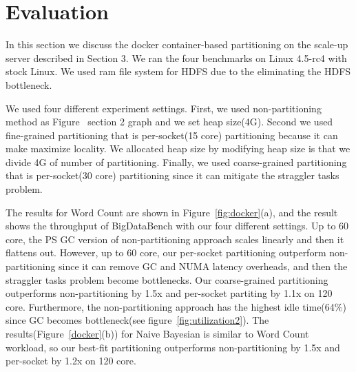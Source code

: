 \section{Evaluation}

In this section we discuss the docker container-based partitioning on the
scale-up server described in Section 3.
We ran the four benchmarks on Linux 4.5-rc4 with stock Linux. 
We used ram file system for HDFS due to the eliminating the HDFS bottleneck.

We used four different experiment settings.
First, we used non-partitioning method as Figure~ section 2 graph and we set
heap size(4G).
Second we used fine-grained partitioning that is per-socket(15 core) partitioning
because it can make maximize locality.
We allocated heap size by modifying heap size is that we divide 4G of number of
partitioning.
Finally, we used coarse-grained partitioning that is per-socket(30 core) partitioning
since it can mitigate the straggler tasks problem.

The results for Word Count are shown in Figure~\ref{fig:docker}(a), and the
result shows the throughput of BigDataBench with our four different settings.
Up to 60 core, the PS GC version of non-partitioning approach scales linearly and
then it flattens out.
However, up to 60 core, our per-socket partitioning outperform non-partitioning
since it can remove GC and NUMA latency overheads, and then the straggler tasks
problem become bottlenecks.
Our coarse-grained partitioning outperforms non-partitioning by 1.5x and
per-socket partiting by 1.1x on 120 core.
Furthermore, the non-partitioning approach has the highest idle time(64\%) since
GC becomes bottleneck(see figure~\ref{fig:utilization2}). 
The results(Figure~\ref{docker}(b)) for Naive Bayesian is similar to Word Count
workload, so our best-fit partitioning outperforms non-partitioning by 1.5x and per-socket
by 1.2x on 120 core.


